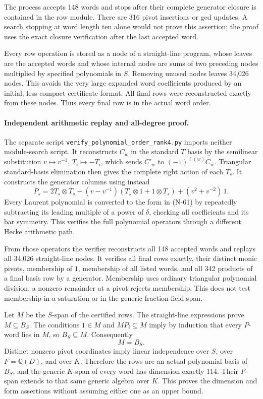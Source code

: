 The process accepts 148 words and stops after their complete
generator closure is contained in the row module.  There
are 316 pivot insertions or gcd updates.  A search stopping
at word length ten alone would not prove this assertion;
the proof uses the exact closure verification after the
last accepted word.

Every row operation is stored as a node of a straight-line
program, whose leaves are the accepted words and whose
internal nodes are sums of two preceding nodes multiplied
by specified polynomials in $S$.  Removing unused nodes
leaves 34,026 nodes.  This avoids the very large expanded
word coefficients produced by an initial, less compact
certificate format.  All final rows were reconstructed
exactly from these nodes.  Thus every final row is in the
actual word order.

\paragraph{Independent arithmetic replay and all-degree proof.}
The separate script
\nolinkurl{verify_polynomial_order_rank4.py} imports neither
module-search script.  It reconstructs $C_w$ in the standard
$T$ basis by the semilinear substitution
$v\mapsto v^{-1}$, $T_i\mapsto-T_i$, which sends
$C'_w$ to $(-1)^{\ell(w)}C_w$.  Triangular standard-basis
elimination then gives the complete right action of each
$T_s$.  It constructs the generator columns using instead
\[
 P_s=2T_s\otimes T_s-(v-v^{-1})(T_s\otimes1+1\otimes T_s)
                         +(v^2+v^{-2})\,1.
 \tag{N-64}
\]
Every Laurent polynomial is converted to the form in (N-61)
by repeatedly subtracting its leading multiple of a power
of $\delta$, checking all coefficients and its bar symmetry.
This verifies the full polynomial operators through a
different Hecke arithmetic path.

From those operators the verifier reconstructs all 148
accepted words and replays all 34,026 straight-line nodes.
It verifies all final rows exactly, their distinct monic
pivots, membership of $1$, membership of all listed words,
and all 342 products of a final basis row by a generator.
Membership uses ordinary triangular polynomial division:
a nonzero remainder at a pivot rejects membership.  This
does not test membership in a saturation or in the generic
fraction-field span.

Let $M$ be the $S$-span of the certified rows.  The
straight-line expressions prove $M\subseteq B_S$.
The conditions $1\in M$ and $MP_i\subseteq M$ imply by
induction that every $P$-word lies in $M$, so $B_S\subseteq M$.
Consequently
\[
                         M=B_S.
 \tag{N-65}
\]
Distinct nonzero pivot coordinates imply linear independence
over $S$, over $F=\mathbb Q(D)$, and over $K$.  Therefore
the rows are an actual polynomial basis of $B_S$, and the
generic $K$-span of every word has dimension exactly 114.
Their $F$-span extends to that same generic algebra over $K$.
This proves the dimension and form assertions without
assuming either one as an upper bound.

